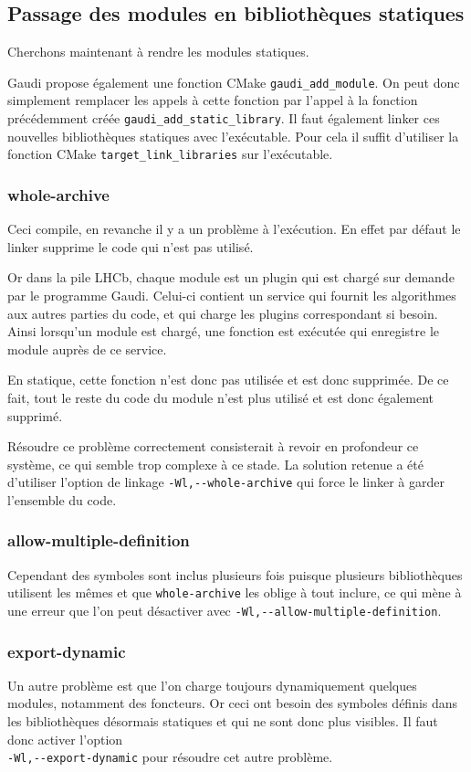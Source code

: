 \documentclass[a4paper,11pt]{report}
\begin{document}
\subsection{Passage des modules en bibliothèques statiques}
Cherchons maintenant à rendre les modules statiques.

Gaudi propose également une fonction CMake \verb'gaudi_add_module'.
On peut donc simplement remplacer les appels à cette fonction par l'appel à la fonction précédemment créée \verb'gaudi_add_static_library'.
Il faut également linker ces nouvelles bibliothèques statiques avec l'exécutable.
Pour cela il suffit d'utiliser la fonction CMake \verb'target_link_libraries' sur l'exécutable.

\subsubsection{whole-archive}
Ceci compile, en revanche il y a un problème à l'exécution.
En effet par défaut le linker supprime le code qui n'est pas utilisé.

Or dans la pile LHCb, chaque module est un plugin qui est chargé sur demande par le programme Gaudi.
Celui-ci contient un service qui fournit les algorithmes aux autres parties du code, et qui charge les plugins correspondant si besoin.
Ainsi lorsqu'un module est chargé, une fonction est exécutée qui enregistre le module auprès de ce service.

En statique, cette fonction n'est donc pas utilisée et est donc supprimée.
De ce fait, tout le reste du code du module n'est plus utilisé et est donc également supprimé.

Résoudre ce problème correctement consisterait à revoir en profondeur ce système, ce qui semble trop complexe à ce stade.
La solution retenue a été d'utiliser l'option de linkage \verb'-Wl,--whole-archive' qui force le linker à garder l'ensemble du code.

\subsubsection{allow-multiple-definition}
Cependant des symboles sont inclus plusieurs fois puisque plusieurs bibliothèques utilisent les mêmes et que \verb'whole-archive' les oblige à tout inclure,
ce qui mène à une erreur que l'on peut désactiver avec \verb'-Wl,--allow-multiple-definition'.

\subsubsection{export-dynamic}
Un autre problème est que l'on charge toujours dynamiquement quelques modules, notamment des foncteurs.
Or ceci ont besoin des symboles définis dans les bibliothèques désormais statiques et qui ne sont donc plus visibles.
Il faut donc activer l'option \\
\verb'-Wl,--export-dynamic' pour résoudre cet autre problème.
\end{document}
